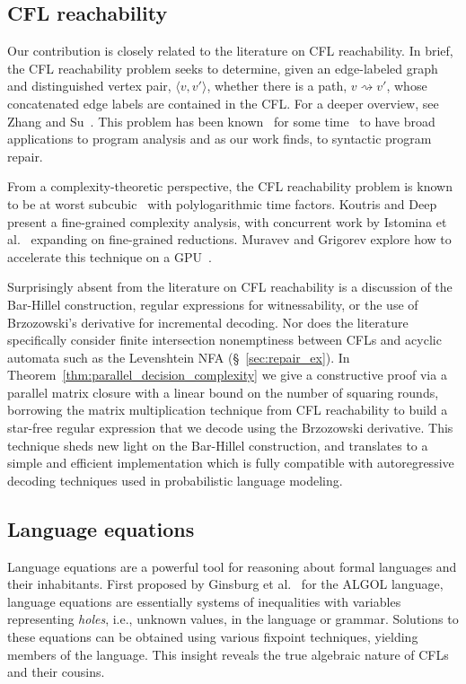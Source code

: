 \documentclass[popl.tex]{subfiles}
\begin{document}
\subsection{CFL reachability}

Our contribution is closely related to the literature on CFL reachability. In brief, the CFL reachability problem seeks to determine, given an edge-labeled graph and distinguished vertex pair, $\langle v, v' \rangle$, whether there is a path, $v \rightsquigarrow v'$, whose concatenated edge labels are contained in the CFL. For a deeper overview, see Zhang and Su~\cite{zhang2017context}. This problem has been known~\cite{reps1998program} for some time~\cite{kodumal2004set} to have broad applications to program analysis and as our work finds, to syntactic program repair.

From a complexity-theoretic perspective, the CFL reachability problem is known to be at worst subcubic~\cite{chistikov2022subcubic} with polylogarithmic time factors. Koutris and Deep~\cite{koutris2023fine} present a fine-grained complexity analysis, with concurrent work by Istomina et al.~\cite{istomina2023fine} expanding on fine-grained reductions. Muravev and Grigorev explore how to accelerate this technique on a GPU~\cite{muravev2025universal}.

Surprisingly absent from the literature on CFL reachability is a discussion of the Bar-Hillel construction, regular expressions for witnessability, or the use of Brzozowski's derivative for incremental decoding. Nor does the literature specifically consider finite intersection nonemptiness between CFLs and acyclic automata such as the Levenshtein NFA (\S~\ref{sec:repair_ex}). In Theorem~\ref{thm:parallel_decision_complexity} we give a constructive proof via a parallel matrix closure with a linear bound on the number of squaring rounds, borrowing the matrix multiplication technique from CFL reachability to build a star-free regular expression that we decode using the Brzozowski derivative. This technique sheds new light on the Bar-Hillel construction, and translates to a simple and efficient implementation which is fully compatible with autoregressive decoding techniques used in probabilistic language modeling.

\subsection{Language equations}

Language equations are a powerful tool for reasoning about formal languages and their inhabitants. First proposed by Ginsburg et al.~\cite{ginsburg1962two} for the ALGOL language, language equations are essentially systems of inequalities with variables representing \textit{holes}, i.e., unknown values, in the language or grammar. Solutions to these equations can be obtained using various fixpoint techniques, yielding members of the language. This insight reveals the true algebraic nature of CFLs and their cousins.
\end{document}
